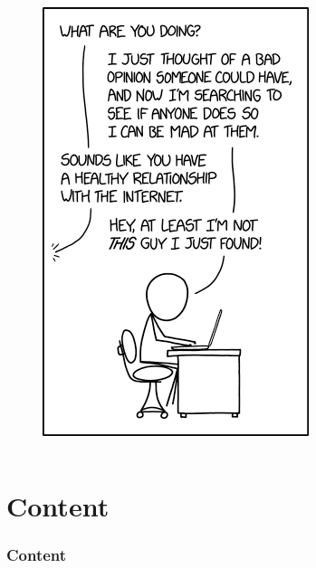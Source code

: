 \documentclass{beamer}
\begin{document}
\begin{frame}
\begin{columns}
\begin{column}{.4\textwidth}
\begin{figure}
			\includegraphics[width=\textwidth]{fig/bad_opinions.png}
		\end{figure}
	\end{column}
\end{columns}

\end{frame}

\section*{Content}
\label{sec:main-content}
\begin{frame}%
\frametitle{Content}
\tableofcontents %
\end{frame}
\end{document}
